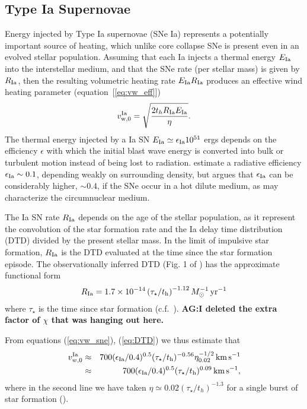 \documentclass[usenatbib,fleqn]{mn2e}
\newcommand{\RateIa}{R_{\rm Ia}}
\begin{document}
\subsection{Type Ia Supernovae} 

Energy injected by Type Ia supernovae (SNe Ia) represents a potentially important source of heating, which unlike core collapse SNe is present even in an evolved stellar population.  Assuming that each Ia injects a thermal energy $E_{\rm Ia}$ into the interstellar medium, and that the SNe rate (per stellar mass) is given by $R_{\rm   Ia}$, then the resulting volumetric heating rate $E_{\rm Ia}R_{\rm  Ia}$ produces an effective wind heating parameter (equation~[\ref{eq:vw_eff}]) \begin{align} v_{\rm w,0}^{\rm Ia} =\sqrt{\frac{2 t_h R_{\rm Ia}
E_{\rm Ia}}{\eta}} \label{eq:vw_sne}.
\end{align} The thermal energy injected by a Ia SN $E_{\rm Ia} \simeq
\epsilon_{\rm Ia} 10^{51}$ ergs depends on the efficiency $\epsilon$
with which the initial blast wave energy is converted into bulk or turbulent
motion instead of being lost to radiation.  \cite{Thornton+98}
estimate a radiative efficiency $\epsilon_{\rm Ia} \sim 0.1$,
depending weakly on surrounding density, but \citet{Sharma+14} argues
that $\epsilon_{\rm Ia}$ can be considerably higher, $\sim 0.4$, if
the SNe occur in a hot dilute medium, as may characterize the circumnuclear medium.

The Ia SN rate $\RateIa$ depends on the age of the stellar population, as it represent the convolution of the star formation rate and the Ia delay time distribution (DTD) divided by the present stellar mass.  In
the limit of impulsive star formation, $\RateIa$ is the DTD evaluated at the time since the star formation episode.  The observationally inferred DTD (Fig. 1 of \citealt{MaozMannucci+:2012a}) has the
approximate functional form \begin{align}
  R_{\rm Ia} =1.7\times 10^{-14}\left(\tau_{\star}/t_{\rm
      h}\right)^{-1.12} M_{\odot}^{-1}\,{\rm yr^{-1}}
\label{eq:DTD}
  \end{align}
  where $\tau_{\star}$ is the time since star formation
  (c.f.~\citealt{Scannapieco&Bildsten05}). {\bf AG:I deleted the extra
    factor of $\chi$ that was hanging out here.}

From equations (\ref{eq:vw_sne}), (\ref{eq:DTD}) we thus estimate that 
  \begin{eqnarray} 
    v_{w,0}^{\rm Ia} &\approx& 700(\epsilon_{\rm
      Ia}/0.4)^{0.5}(\tau_{\star}/t_{\rm h})^{-0.56}\eta_{0.02}^{-1/2}\,{\rm km
      \,s^{-1}} \nonumber \\
&\approx& 700(\epsilon_{\rm
      Ia}/0.4)^{0.5}(\tau_{\star}/t_{\rm h})^{0.09}\,{\rm km
      \,s^{-1}},
\label{eq:vIa}
  \end{eqnarray}
where in the second line we have taken $\eta\simeq 0.02 (\tau_{\star}/t_h)^{-1.3}$ for a single burst of star formation (\citealt{Ciotti+91}).
\end{document}
